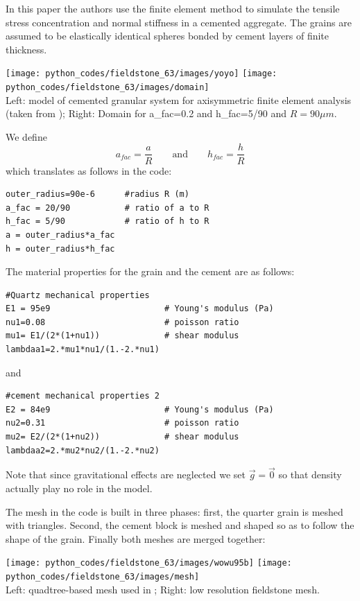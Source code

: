 In this paper the authors use the finite element method to simulate 
the tensile stress concentration and normal stiffness in a cemented
aggregate. The grains are assumed to be elastically identical spheres
bonded by cement layers of finite thickness.

\begin{center}
\texttt{[image: python\_codes/fieldstone\_63/images/yoyo]}
\texttt{[image: python\_codes/fieldstone\_63/images/domain]}\\
{\captionfont Left: model of cemented granular system for 
axisymmetric finite element analysis (taken from \cite{wowu95}); Right: 
Domain for a\_fac=0.2 and h\_fac=5/90 and $R=90\mu m$.}
\end{center}

We define
\[
a_{fac} = \frac{a}{R}  
\qquad
\text{and}
\qquad 
h_{fac} = \frac{h}{R}
\]
which translates as follows in the code:
\begin{lstlisting}
outer_radius=90e-6      #radius R (m)  
a_fac = 20/90           # ratio of a to R 
h_fac = 5/90            # ratio of h to R
a = outer_radius*a_fac
h = outer_radius*h_fac
\end{lstlisting}

The material properties for the grain and the cement are as follows:

\begin{lstlisting}
#Quartz mechanical properties
E1 = 95e9                       # Young's modulus (Pa)
nu1=0.08                        # poisson ratio
mu1= E1/(2*(1+nu1))             # shear modulus
lambdaa1=2.*mu1*nu1/(1.-2.*nu1)  
\end{lstlisting}
and
\begin{lstlisting}
#cement mechanical properties 2 
E2 = 84e9                       # Young's modulus (Pa)
nu2=0.31                        # poisson ratio
mu2= E2/(2*(1+nu2))             # shear modulus
lambdaa2=2.*mu2*nu2/(1.-2.*nu2)  
\end{lstlisting}

Note that since gravitational effects are neglected we set $\vec{g}=\vec{0}$
so that density actually play no role in the model.

The mesh in the code is built in three phases: first, the quarter grain is meshed 
with triangles. Second, the cement block is meshed and shaped so as to follow the 
shape of the grain. Finally both meshes are merged together:

\begin{center}
\texttt{[image: python\_codes/fieldstone\_63/images/wowu95b]}
\texttt{[image: python\_codes/fieldstone\_63/images/mesh]}\\
{\captionfont Left: quadtree-based mesh used in \cite{wowu95}; 
Right: low resolution fieldstone mesh.}
\end{center}

